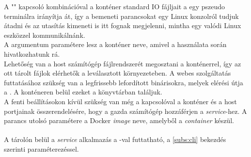 A "" kapcsoló kombinációval a konténer standard IO fájljait a egy pszeudo terminálra irányítja át, így a bemeneti parancsokat egy Linux konzolról tudjuk átadni és az utasítás kimeneti is itt fognak megjelenni, mintha egy valódi Linux eszközzel kommunikálnánk. \\
A  argumentum paramétere lesz a konténer neve, amivel a használata során hivatkozhatunk rá.\\
Lehetőség van a host számítógép fájlrendszerét megosztani a konténerrel, így az ott tárolt fájlok elérhetők a leválasztott környezeteben. A webes szolgáltatás futtatásához szükség van a legfrissebb lefordított binárisokra, melyek elérési útja a . A konténeren belül ezeket a  könyvtárban találjuk.\\
A fenti beállításokon kívül szükség van még a  kapcsolóval a konténer és a host portjainak összerendelésére, hogy a gazda számítógép hozzáférjen a \emph{service}-hez. A  parancs utolsó paramétere a Docker \emph{image} neve, amelyből a \emph{container} készül.\\
\\
A tárolón belül a \emph{service} alkalmazás a -val futtatható, a \ref{subs:cli} bekezdés szerinti paraméterezéssel.